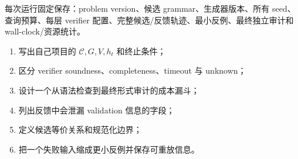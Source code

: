 \begin{protocolbox}
每次运行固定保存：problem version、候选 grammar、生成器版本、所有 seed、查询预算、每层 verifier 配置、完整候选/反馈轨迹、最小反例、最终独立审计和 wall-clock/资源统计。
\end{protocolbox}

\begin{checkpointbox}
\begin{enumerate}
  \item 写出自己项目的 $\mathcal C,G,V,h_t$ 和终止条件；
  \item 区分 verifier soundness、completeness、timeout 与 unknown；
  \item 设计一个从语法检查到最终形式审计的成本漏斗；
  \item 列出反馈中会泄漏 validation 信息的字段；
  \item 定义候选等价关系和规范化边界；
  \item 把一个失败输入缩成更小反例并保存可重放信息。
\end{enumerate}
\end{checkpointbox}

